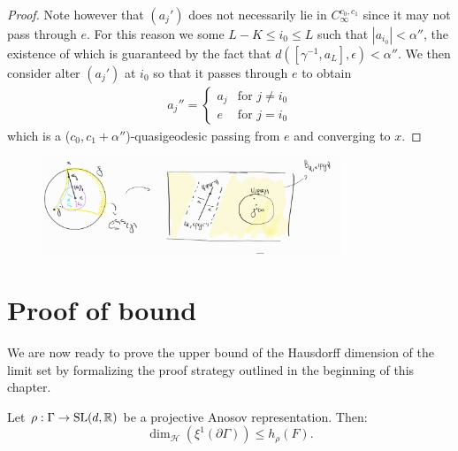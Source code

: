 \documentclass{report}
\begin{document}
\begin{proof}
    Note however that $(a_j')$ does not necessarily lie in $C_\infty^{c_0, c_1}$ since it may not pass through $e$.
    For this reason we some $L - K \leq i_0\leq L$ such that $|a_{i_0}| < \alpha''$, the existence of which is guaranteed by the fact that $d([\gamma^{-1}, a_L], \epsilon) < \alpha''$.
    We then consider alter $(a_j')$ at $i_0$ so that it passes through $e$ to obtain 
    \begin{align*}
        a_j''=
        \begin{cases}
            a_j & \text{for } j\neq i_0 \\
            e & \text{for } j = i_0
        \end{cases}      
    \end{align*}
    which is a ($c_0, c_1 + \alpha''$)-quasigeodesic passing from $e$ and converging to $x$.
\end{proof}
\begin{figure}[h]
    \centering
    \includegraphics[width=0.8\textwidth]{cone.jpg}
\end{figure}
\section{Proof of bound}
We are now ready to prove the upper bound of the Hausdorff dimension of the limit set by formalizing the proof strategy outlined in the beginning of this chapter.
\begin{lemma}\label{lem:upper_bound}
Let $\rho: \Gamma \to \operatorname{{\mathrm{SL}}}(d, \mathbb R)$ be a projective Anosov representation. 
Then:
\[
    \dim_{\mathcal H}(\xi^1 (\partial \Gamma) ) \leq h_\rho(F).
\]
\end{lemma}
\end{document}

